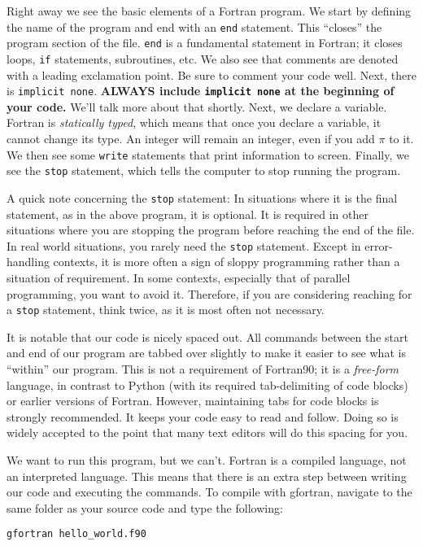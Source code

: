 \documentclass[11pt, letterpaper]{article}
\begin{document}
Right away we see the basic elements of a Fortran program.  We start by
defining the name of the program and end with an {\tt end} statement.  This
``closes'' the program section of the file.  {\tt end} is a fundamental
statement in Fortran; it closes loops, {\tt if} statements, subroutines, etc.
We also see that comments are denoted with a leading exclamation point.
Be sure to comment your code well.  Next, there is \texttt{implicit none}.
\textbf{ALWAYS include \texttt{implicit none} at the beginning of your code.}
We'll talk more about that shortly.  Next, we declare a variable.  Fortran
is \emph{statically typed}, which means that once you declare a variable, it
cannot change its type.  An integer will remain an integer, even if you add
$\pi$ to it.  We then see some \texttt{write} statements that print information
to screen.  Finally, we see the \texttt{stop} statement, which tells the
computer to stop running the program.

A quick note concerning the \texttt{stop} statement: In situations where it is the
final statement, as in the above program, it is optional.  It is required in
other situations where you are stopping the program before reaching the end
of the file.  In real world situations, you rarely need the \texttt{stop}
statement.  Except in error-handling contexts, it is more often a sign of
sloppy programming rather than a situation of requirement.  In some contexts,
especially that of parallel programming, you want to avoid it.  Therefore,
if you are considering reaching for a \texttt{stop} statement, think twice, as it
is most often not necessary.

It is notable that our code is nicely spaced out.  All commands
between the start and end of our program are tabbed over slightly to make it
easier to see what is ``within'' our program.  This is not a requirement of
Fortran90; it is a \emph{free-form} language, in contrast to Python
(with its required tab-delimiting of code blocks) or earlier versions of
Fortran.  However, maintaining tabs for code blocks is strongly recommended.
It keeps your code easy to read and follow.  Doing so is widely accepted to
the point that many text editors will do this spacing for you.

We want to run this program, but we can't.  Fortran is a compiled language,
not an interpreted language.  This means that there is an extra step between
writing our code and executing the commands.  To compile with gfortran,
navigate to the same folder as your source code and type the following:
\begin{verbatim}
gfortran hello_world.f90
\end{verbatim}
\end{document}
